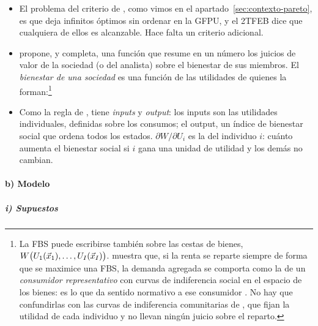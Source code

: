 \documentclass[11pt]{article}
\begin{document}
\begin{itemize}
\item El problema del criterio de , como vimos en el apartado~\ref{sec:contexto-pareto}, es que deja infinitos óptimos sin ordenar en la GFPU, y el 2TFEB dice que cualquiera de ellos es alcanzable. Hace falta un criterio adicional.
\item \textcite{Bergson1938Reformulation} propone, y \textcite{Samuelson1947Foundations} completa, una función que resume en un número los juicios de valor de la sociedad (o del analista) sobre el bienestar de sus miembros. El \emph{bienestar de una sociedad} es una función de las utilidades de quienes la forman:\footnote{La FBS puede escribirse también sobre las cestas de bienes, $W\big(U_1(\vec{x}_1),\dots,U_I(\vec{x}_I)\big)$. \textcite{Samuelson1956Social} muestra que, si la renta se reparte siempre de forma que se maximice una FBS, la demanda agregada se comporta como la de un \emph{consumidor representativo} con curvas de indiferencia social en el espacio de los bienes: es lo que da sentido normativo a ese consumidor . No hay que confundirlas con las curvas de indiferencia comunitarias de \textcite{Scitovsky1942Reconsideration}, que fijan la utilidad de cada individuo y no llevan ningún juicio sobre el reparto.}
\item Como la regla de , tiene \emph{inputs} y \emph{output}: los inputs son las utilidades individuales, definidas sobre los consumos; el output, un índice de bienestar social que ordena todos los estados. $\partial W/\partial U_i$ es la  del individuo $i$: cuánto aumenta el bienestar social si $i$ gana una unidad de utilidad y los demás no cambian.
\end{itemize}

\paragraph{b) Modelo}

\subparagraph{i) Supuestos}
\end{document}
